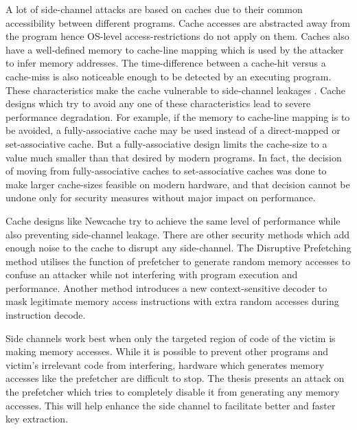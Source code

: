 A lot of side-channel attacks are based on caches due to their common
accessibility between different programs. Cache accesses are abstracted away
from the program hence OS-level access-restrictions do not apply on them.
Caches also have a well-defined memory to cache-line mapping which is used
by the attacker to infer memory addresses. The time-difference between
a cache-hit versus a cache-miss is also noticeable enough to be detected
by an executing program. These characteristics make the cache vulnerable to
side-channel leakages .
Cache designs which try to avoid any one of these characteristics lead to severe
performance degradation. For example, if the memory to cache-line mapping is to be
avoided, a fully-associative cache may be used instead of a direct-mapped
or set-associative cache. But a fully-associative design limits the cache-size
to a value much smaller than that desired by modern programs. In fact, the decision
of moving from fully-associative caches to set-associative caches was done
to make larger cache-sizes feasible on modern hardware, and that decision cannot
be undone only for security measures without major impact on performance.

Cache designs like Newcache  try to achieve the same level
of performance while also preventing side-channel leakage.
There are other security methods which add enough noise
to the cache to disrupt any side-channel.
The Disruptive Prefetching  method utilises
the function of prefetcher to generate random memory accesses to confuse an attacker
while not interfering with program execution and performance.
Another method introduces a new context-sensitive decoder 
to mask legitimate memory access instructions with extra random accesses during
instruction decode.

Side channels work best when only the targeted region of code of the victim
is making memory accesses. While it is possible to prevent other programs and
victim's irrelevant code from interfering, hardware which generates memory
accesses like the prefetcher are difficult to stop. The thesis presents an
attack on the prefetcher which tries to completely disable it from
generating any memory accesses. This will help enhance the side channel
to facilitate better and faster key extraction.



